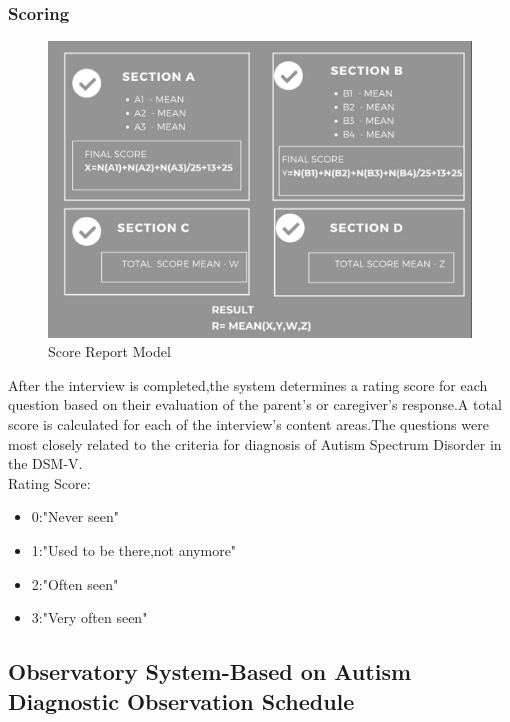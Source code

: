 \subsubsection{Scoring} 
\begin{figure}[h]
\label{ss}
\centering
\includegraphics[width= 14 cm]{Score.jpeg}
\caption{Score Report Model}
\end{figure}
After the interview is completed,the system determines a rating score for each question based on their evaluation of the parent's or caregiver's response.A total score is calculated for each of the interview's content areas.The questions were most closely related to the criteria for diagnosis of Autism Spectrum Disorder in the DSM-V. 
\\

Rating Score:
\begin{itemize}
    \item 0:"Never seen"
    \item 1:"Used to be there,not anymore"
    \item 2:"Often seen"
    \item 3:"Very often seen"
\end{itemize}

 

\subsection{Observatory System-Based on Autism Diagnostic Observation Schedule}

